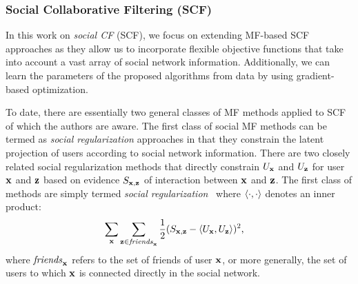 
\subsubsection{Social Collaborative Filtering (SCF)}
\label{sec:scf_original}

In this work on \emph{social CF} (SCF), we %
focus on extending
MF-based SCF 
approaches as  they allow us to incorporate flexible 
objective functions that take into account a vast array of social
network information. Additionally, we can learn the parameters 
of the proposed algorithms from data by using
gradient-based optimization.


To date, there are essentially two general classes of MF methods
applied to SCF of which the authors are aware.  
The first class of social MF methods can be termed as \emph{social
regularization} approaches in that they %
constrain the latent
projection of users according to social network information.  There
are two closely related social regularization methods that directly
constrain $U_{\mathbf{x}}$ and $U_{\mathbf{z}}$ for user $\mathbf{x}$ and $\mathbf{z}$ based on evidence
$S_{\mathbf{x},\mathbf{z}}$ of interaction between $\mathbf{x}$ and $\mathbf{z}$.  The first class of
methods are simply termed \emph{social
regularization}~\cite{lla,socinf} where $\langle \cdot, \cdot \rangle$ denotes an inner
product:
\begin{align}
\sum_{\x} & \sum_{\z \in \mathit{friends}_\x} \frac{1}{2} (S_{\x,\z} - \la U_\x, U_\z \ra)^2 \label{eq:simple_sr}
\text{,} %
\end{align}
where  $\mathit{friends}_{\mathbf{x}}$ refers to the set of friends of user $\mathbf{x}$, or more generally, the 
set of users to which $\mathbf{x}$ is connected directly in the social network.
%

